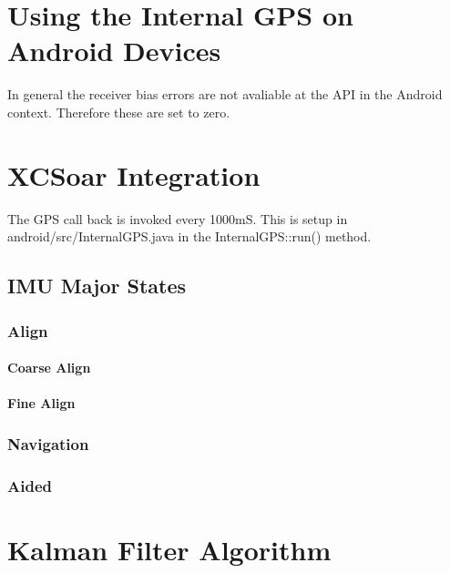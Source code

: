 \documentclass[a4paper]{report}
\numberwithin{equation}{chapter}
\begin{document}
\clearpage\setcounter{page}{1}
\chapter[Using the Internal GPS on Android Devices]{Using the Internal GPS on Android Devices}

In general the receiver bias errors are not avaliable at the API in the Android context. Therefore these are set to zero.

\clearpage\setcounter{page}{1}
\chapter[XCSoar Integration]{XCSoar Integration}

The GPS call back is invoked every 1000mS. This is setup in android/src/InternalGPS.java in the InternalGPS::run() method.

\section[IMU Major States]{IMU Major States}

\subsection[Align]{Align}

\subsubsection[Coarse Align]{Coarse Align}

\subsubsection[Fine Align]{Fine Align}

\subsection[Navigate]{Navigation}

\subsection[Aided]{Aided}

\appendix

\clearpage\setcounter{page}{1}
\chapter[Kalman Filter Algorithm]{Kalman Filter Algorithm}
\end{document}

